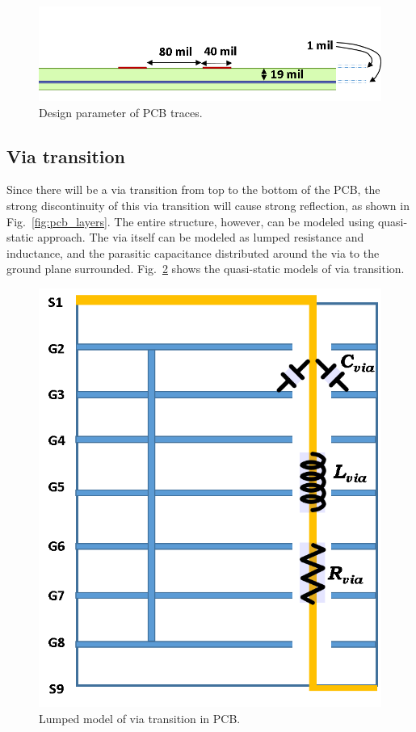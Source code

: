 \documentclass{pj}
\begin{document}
\begin{figure}[htbp!]
	\centering
	\includegraphics[width=0.8\columnwidth]{./img/PCB/differential_PCB_2D_CrossSection.png}
	\caption{Design parameter of PCB traces.}
	\label{fig:pcb_trace} %
\end{figure}


\subsection{Via transition}
Since there will be a via transition from top to the bottom of the PCB, the strong discontinuity of this via transition will cause strong reflection, as shown in Fig.~\ref{fig:pcb_layers}. The entire structure, however, can be modeled using quasi-static approach. The via itself can be modeled as lumped resistance and inductance, and the parasitic capacitance distributed around the via to the ground plane surrounded. Fig.~\ref{fig:pcb_via_tran_LC} shows the quasi-static models of via transition. 

\begin{figure}[htbp!]
	\centering
	\includegraphics[width=0.8\columnwidth]{./img/PCB/Via_Transition/Via_transition_LC_modeling.png}
	\caption{Lumped model of via transition in PCB.}
	\label{fig:pcb_via_tran_LC} %
\end{figure}
\end{document}
